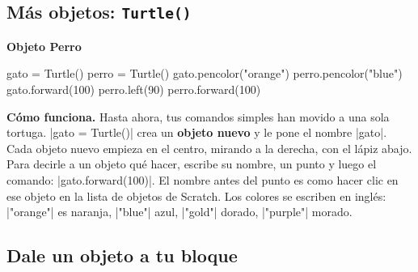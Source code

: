 \subsection*{Más objetos: \texttt{Turtle()}}

\begin{tcbraster}[raster columns=2, raster equal height=rows, raster column skip=12pt, raster valign=center, raster force size=false, raster column 1/.style={add to width=-1.2cm}, raster column 2/.style={add to width=1.2cm}]
\begin{tcolorbox}[colback=white, colframe=white, boxrule=0pt, valign=center]
\par
\begin{scratch}
\end{scratch}
\par\smallskip
{\small\bfseries Objeto Perro}\par
\begin{scratch}
\end{scratch}
\end{tcolorbox}
\begin{code}
gato = Turtle()
perro = Turtle()
gato.pencolor("orange")
perro.pencolor("blue")
gato.forward(100)
perro.left(90)
perro.forward(100)
\end{code}
\end{tcbraster}

\textbf{Cómo funciona.} Hasta ahora, tus comandos simples han movido a una sola tortuga. \py|gato = Turtle()| crea un \textbf{objeto nuevo} y le pone el nombre \py|gato|. Cada objeto nuevo empieza en el centro, mirando a la derecha, con el lápiz abajo. Para decirle a un objeto qué hacer, escribe su nombre, un punto y luego el comando: \py|gato.forward(100)|. El nombre antes del punto es como hacer clic en ese objeto en la lista de objetos de Scratch. Los colores se escriben en inglés: \py|"orange"| es naranja, \py|"blue"| azul, \py|"gold"| dorado, \py|"purple"| morado.


\subsection*{Dale un objeto a tu bloque}

